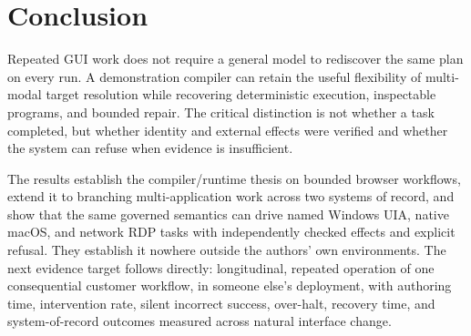 \section{Conclusion}

Repeated GUI work does not require a general model to rediscover the same plan
on every run. A demonstration compiler can retain the useful flexibility of
multi-modal target resolution while recovering deterministic execution,
inspectable programs, and bounded repair. The critical distinction is not
whether a task completed, but whether identity and external effects were
verified and whether the system can refuse when evidence is insufficient.

The results establish the compiler/runtime thesis on bounded browser workflows,
extend it to branching multi-application work across two systems of record, and
show that the same governed semantics can drive named Windows UIA, native
macOS, and network RDP tasks with independently checked effects and explicit
refusal. They establish it nowhere outside the authors' own environments. The
next evidence target follows directly: longitudinal, repeated operation of one
consequential customer workflow, in someone else's deployment, with authoring
time, intervention rate, silent
incorrect success, over-halt, recovery time, and system-of-record outcomes
measured across natural interface change.
